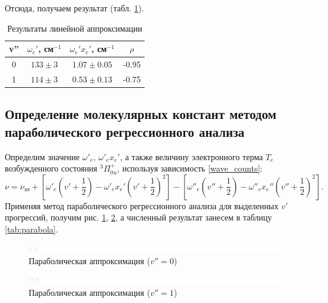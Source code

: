 Отсюда, получаем результат (табл. \ref{tab:linear_approx}).
\begin{table}[h!]
	\centering
	\caption{Результаты линейной аппроксимации}
	\begin{tabular}{|c|c|c|c|}
		\hline
		\multicolumn{1}{|l|}{v''} & \multicolumn{1}{l|}{$\omega_e'$, см$^{-1}$} & \multicolumn{1}{l|}{$\omega_e' x_e'$, см$^{-1}$} & \multicolumn{1}{c|}{$\rho$} \bigstrut\\
		\hline
		0 & $133\pm 3$ & $1.07\pm 0.05$& -0.95 \bigstrut\\
		\hline
		1 & $114\pm 3$& $0.53\pm 0.13$ & -0.75 \bigstrut\\
		\hline
	\end{tabular}%
	\label{tab:linear_approx}%
\end{table}%

\subsection{Определение молекулярных констант методом параболического регрессионного анализа}

Определим значение $\omega'_e$, $\omega'_e x_e'$, а также величину электронного терма $T_e$ возбужденного состояния $^3\Pi^+_{0u}$, используя зависимость \eqref{wave_counts}:
\begin{equation}
\nu = \nu_{\text{эл}} + \left[\omega'_e\left(v'+\frac{1}{2}\right)-\omega'_e x_e'\left(v'+\frac{1}{2}\right)^2\right]-\left[\omega''_e\left(v''+\frac{1}{2}\right)-\omega''_e x_e''\left(v''+\frac{1}{2}\right)^2\right].
\label{wave_counts}
\end{equation}
Применяя метод параболического регрессионного анализа для выделенных $v'$ прогрессий, получим рис. \ref{parabola_half_0}, \ref{parabola_half_1}, а численный результат занесем в таблицу \ref{tab:parabola}.
\begin{figure}[h!]
	\centering
	\includegraphics[height=0.4\textheight]{data/parabola_half_0}
	\caption{Параболическая аппроксимация ($v'' = 0$)}
	\label{parabola_half_0}
\end{figure}
\begin{figure}[h!]
	\centering
	\includegraphics[height=0.4\textheight]{data/parabola_half_1}
	\caption{Параболическая аппроксимация ($v'' = 1$)}
	\label{parabola_half_1}
\end{figure}

